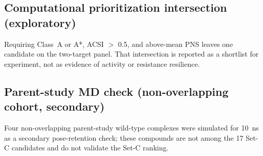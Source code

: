 \documentclass[journal=jcisd8,manuscript=article,layout=traditional]{achemso}
\begin{document}
\subsection{Computational prioritization intersection (exploratory)}

Requiring Class~A or A*, ACSI $>$ \num{0.5}, and above-mean PNS leaves one candidate on the two-target panel. That intersection is reported as a shortlist for experiment, not as evidence of activity or resistance resilience.

\subsection{Parent-study MD check (non-overlapping cohort, secondary)}

Four non-overlapping parent-study wild-type complexes were simulated for \qty{10}{\ns} as a secondary pose-retention check; these compounds are not among the 17 Set-C candidates and do not validate the Set-C ranking.

\begin{table}[htbp]
\centering
\caption[MD stability metrics]{Production MD stability metrics for parent-study wild-type complexes (\qty{10}{\ns}). BB RMSD, ligand RMSD, minimum distance, contacts, and H-bonds are computed from PBC-unwrapped trajectories.}
\label{tab:md_stability}
\end{table}
\end{document}
